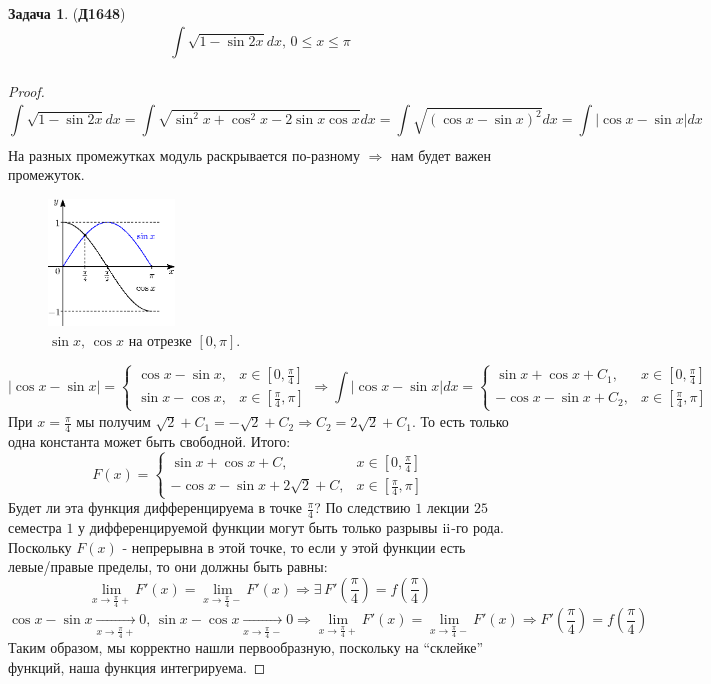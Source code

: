 \documentclass[12pt]{article}
\newcommand{\RN}[1]{%
	\textup{\uppercase\expandafter{\romannumeral#1}}%
}
\theoremstyle{definition}
\newtheorem{problem}{Задача}
\newcommand{\ddint}[2]{\displaystyle\int\limits_{#1}^{#2}}
\begin{document}
\begin{problem}(\textbf{Д1648})
	$$\ddint{}{}\sqrt{1-\sin{2x}}dx, \, 0 \leq  x \leq \pi$$
\end{problem}
\begin{proof}
	$$
		\ddint{}{}\sqrt{1-\sin{2x}}dx = \ddint{}{}\sqrt{\sin^2{x} + \cos^2{x} - 2\sin{x}\cos{x}}dx = \ddint{}{}\sqrt{(\cos{x} - \sin{x})^2}dx = \ddint{}{}|\cos{x} - \sin{x}|dx
	$$
	На разных промежутках модуль раскрывается по-разному $\Rightarrow$ нам будет важен промежуток.
	\begin{figure}[H]
		\centering
		\includegraphics[width=0.3\textwidth]{MA2S1_3.eps}
		\caption{$\sin{x}, \, \cos{x}$ на отрезке $[0,\pi]$.}
		\label{1_3}
	\end{figure}
	$$
		|\cos{x} - \sin{x}| = 
		\begin{cases}
			\cos{x} - \sin{x}, & x \in\left[0,\frac{\pi}{4}\right]\\
			\sin{x} - \cos{x}, & x\in \left[\frac{\pi}{4},\pi\right]
		\end{cases} \Rightarrow \ddint{}{}|\cos{x} - \sin{x}|dx = 
	\begin{cases}
		\sin{x} + \cos{x} + C_1, & x \in\left[0,\frac{\pi}{4}\right]\\
		-\cos{x} - \sin{x} + C_2, & x\in \left[\frac{\pi}{4},\pi\right]
	\end{cases}
	$$
	При $x = \frac{\pi}{4}$ мы получим $\sqrt{2} + C_1 = -\sqrt{2} + C_2 \Rightarrow C_2 = 2\sqrt{2} + C_1$. То есть только одна константа может быть свободной. Итого:
	$$
		F(x) = 	
		\begin{cases}
			\sin{x} + \cos{x} + C, & x \in\left[0,\frac{\pi}{4}\right]\\
			-\cos{x} - \sin{x} + 2\sqrt{2} + C, & x\in \left[\frac{\pi}{4},\pi\right]
		\end{cases}
	$$
	Будет ли эта функция дифференцируема в точке $\frac{\pi}{4}$? По следствию $1$ лекции $25$ семестра $1$ у дифференцируемой функции могут быть только разрывы $\RN{2}$-го рода. Поскольку $F(x)$ - непрерывна в этой точке, то если у этой функции есть левые/правые пределы, то они должны быть равны: 
	$$
		\lim\limits_{x \to \frac{\pi}{4}+}F'(x) = \lim\limits_{x \to \frac{\pi}{4}-}F'(x) \Rightarrow \exists \,  F'\left(\frac{\pi}{4}\right) = f\left(\frac{\pi}{4}\right)
	$$
	$$
		\cos{x} - \sin{x} \xrightarrow[x\to \frac{\pi}{4}+]{} 0 ,\, \sin{x} - \cos{x} \xrightarrow[x\to \frac{\pi}{4}-]{} 0 \Rightarrow \lim\limits_{x \to \frac{\pi}{4}+}F'(x) = \lim\limits_{x \to \frac{\pi}{4}-}F'(x) \Rightarrow F'\left(\frac{\pi}{4}\right) = f\left(\frac{\pi}{4}\right)
	$$
	Таким образом, мы корректно нашли первообразную, поскольку на ``склейке'' функций, наша функция интегрируема.
\end{proof}
\end{document}
